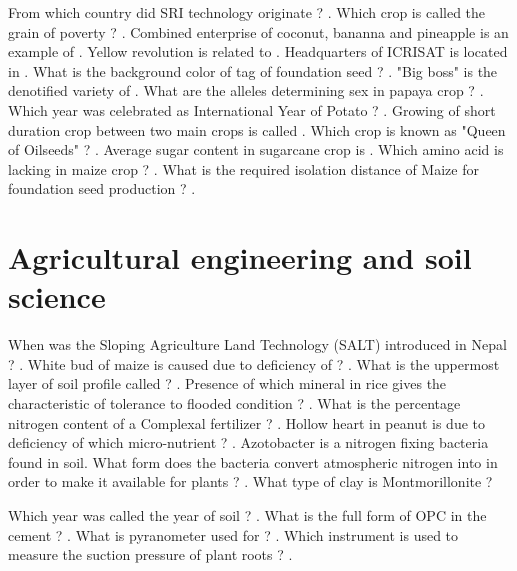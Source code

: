 \documentclass[10pt,a4paper,answers]{exam}
\begin{document}
\begin{questions}
  \question From which country did SRI technology originate ? \fillin[Madagascar][3cm].
  \question Which crop is called the grain of poverty ? \fillin[Rye][3cm].
  \question Combined enterprise of coconut, bananna and pineapple is an example of .
  \question Yellow revolution is related to \fillin[Mustard][3cm].
  \question Headquarters of ICRISAT is located in .
  \question What is the background color of tag of foundation seed ? \fillin[White][3cm].
  \question "Big boss" is the denotified variety of \fillin[Maize][3cm].
  \question What are the alleles determining sex in papaya crop ? \fillin[M1, M2, m][3cm].
  \question Which year was celebrated as International Year of Potato ? \fillin[2008][3cm].
  \question Growing of short duration crop between two main crops is called .
  \question Which crop is known as "Queen of Oilseeds" ? \fillin[Sesame][3cm].
  \question Average sugar content in sugarcane crop is \fillin[10-15\%][3cm].
  \question Which amino acid is lacking in maize crop ? .
  \question What is the required isolation distance of Maize for foundation seed production ? \fillin[300 m][3cm].
\end{questions}

\section*{Agricultural engineering and soil science}

\begin{questions}
  \question When was the Sloping Agriculture Land Technology (SALT) introduced in Nepal ? \fillin[1992 AD][3cm].
  \question White bud of maize is caused due to deficiency of ? \fillin[Zinc][3cm].
  \question What is the uppermost layer of soil profile called ? \fillin[O layer][3cm].
  \question Presence of which mineral in rice gives the characteristic of tolerance to flooded condition ? \fillin[Silica][3cm].
  \question What is the percentage nitrogen content of a Complexal fertilizer ? \fillin[20\%][3cm].
  \question Hollow heart in peanut is due to deficiency of which micro-nutrient ? \fillin[Boron][3cm].
  \question Azotobacter is a nitrogen fixing bacteria found in soil. What form does the bacteria convert atmospheric nitrogen into in order to make it available for plants ? \fillin[Ammonium][3cm].
  \question What type of clay is Montmorillonite ?
  
  \question Which year was called the year of soil ? \fillin[2015][3cm].
  \question What is the full form of OPC in the cement ? .
  \question What is pyranometer used for ? .
  \question Which instrument is used to measure the suction pressure of plant roots ? \fillin[Tensiometer][3cm].
  
\end{questions}
\end{document}
